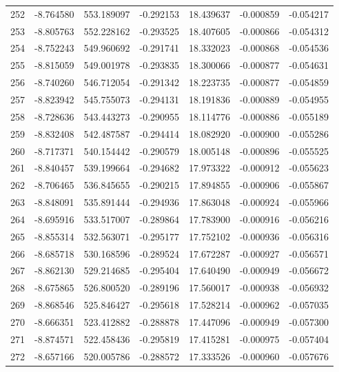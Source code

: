 \begin{tabular}{rrrrrrr}
 252 &  -8.764580 &  553.189097 & -0.292153 &  18.439637 &  -0.000859 & -0.054217 \\
 253 &  -8.805763 &  552.228162 & -0.293525 &  18.407605 &  -0.000866 & -0.054312 \\
 254 &  -8.752243 &  549.960692 & -0.291741 &  18.332023 &  -0.000868 & -0.054536 \\
 255 &  -8.815059 &  549.001978 & -0.293835 &  18.300066 &  -0.000877 & -0.054631 \\
 256 &  -8.740260 &  546.712054 & -0.291342 &  18.223735 &  -0.000877 & -0.054859 \\
 257 &  -8.823942 &  545.755073 & -0.294131 &  18.191836 &  -0.000889 & -0.054955 \\
 258 &  -8.728636 &  543.443273 & -0.290955 &  18.114776 &  -0.000886 & -0.055189 \\
 259 &  -8.832408 &  542.487587 & -0.294414 &  18.082920 &  -0.000900 & -0.055286 \\
 260 &  -8.717371 &  540.154442 & -0.290579 &  18.005148 &  -0.000896 & -0.055525 \\
 261 &  -8.840457 &  539.199664 & -0.294682 &  17.973322 &  -0.000912 & -0.055623 \\
 262 &  -8.706465 &  536.845655 & -0.290215 &  17.894855 &  -0.000906 & -0.055867 \\
 263 &  -8.848091 &  535.891444 & -0.294936 &  17.863048 &  -0.000924 & -0.055966 \\
 264 &  -8.695916 &  533.517007 & -0.289864 &  17.783900 &  -0.000916 & -0.056216 \\
 265 &  -8.855314 &  532.563071 & -0.295177 &  17.752102 &  -0.000936 & -0.056316 \\
 266 &  -8.685718 &  530.168596 & -0.289524 &  17.672287 &  -0.000927 & -0.056571 \\
 267 &  -8.862130 &  529.214685 & -0.295404 &  17.640490 &  -0.000949 & -0.056672 \\
 268 &  -8.675865 &  526.800520 & -0.289196 &  17.560017 &  -0.000938 & -0.056932 \\
 269 &  -8.868546 &  525.846427 & -0.295618 &  17.528214 &  -0.000962 & -0.057035 \\
 270 &  -8.666351 &  523.412882 & -0.288878 &  17.447096 &  -0.000949 & -0.057300 \\
 271 &  -8.874571 &  522.458436 & -0.295819 &  17.415281 &  -0.000975 & -0.057404 \\
 272 &  -8.657166 &  520.005786 & -0.288572 &  17.333526 &  -0.000960 & -0.057676 \\

\end{tabular}
